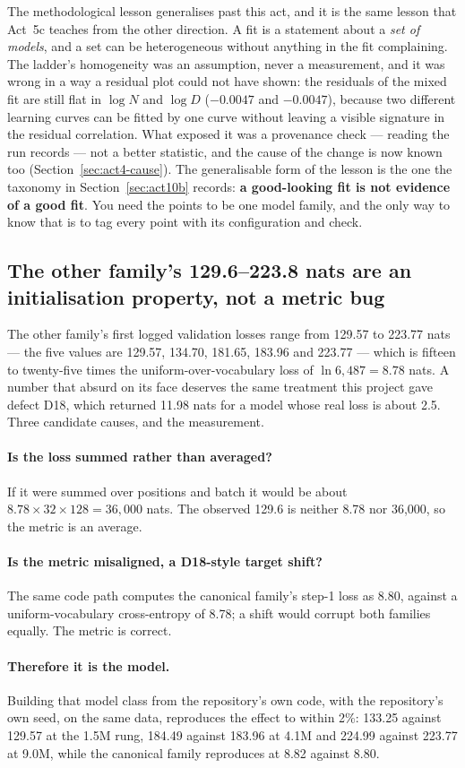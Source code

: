 \documentclass[11pt,a4paper]{article}
\begin{document}
The methodological lesson generalises past this act, and it is the same lesson
that Act~5c teaches from the other direction. A fit is a statement about a
\emph{set of models}, and a set can be heterogeneous without anything in the
fit complaining. The ladder's homogeneity was an assumption, never a
measurement, and it was wrong in a way a residual plot could not have shown:
the residuals of the mixed fit are still flat in $\log N$ and $\log D$
($-0.0047$ and $-0.0047$), because two different learning curves can be
fitted by one curve without leaving a visible signature in the residual
correlation. What exposed it was a provenance check --- reading the run
records --- not a better statistic, and the cause of the change is now known
too (Section~\ref{sec:act4-cause}). The generalisable form of the lesson is
the one the taxonomy in Section~\ref{sec:act10b} records: \textbf{a
good-looking fit is not evidence of a good fit}. You need the points to be one
model family, and the only way to know that is to tag every point with its
configuration and check.

\subsection{The other family's 129.6--223.8 nats are an initialisation property, not a metric bug}
\label{sec:act4-other}

The other family's first logged validation losses range from 129.57 to 223.77
nats --- the five values are 129.57, 134.70, 181.65, 183.96 and 223.77 ---
which is fifteen to twenty-five times the uniform-over-vocabulary loss of
$\ln 6{,}487 = 8.78$ nats. A number that absurd on its face deserves
the same treatment this project gave defect D18, which returned 11.98 nats for
a model whose real loss is about 2.5. Three candidate causes, and the
measurement. %

\paragraph{Is the loss summed rather than averaged?} If it were summed over
positions and batch it would be about $8.78 \times 32 \times 128 = 36{,}000$
nats. The observed 129.6 is neither 8.78 nor 36,000, so the metric is an
average. \paragraph{Is the metric misaligned, a D18-style target shift?} The
same code path computes the canonical family's step-1 loss as 8.80, against a
uniform-vocabulary cross-entropy of 8.78; a shift would corrupt both families
equally. The metric is correct. \paragraph{Therefore it is the model.} Building
that model class from the repository's own code, with the repository's own
seed, on the same data, reproduces the effect to within 2\%: 133.25 against
129.57 at the 1.5M rung, 184.49 against 183.96 at 4.1M and 224.99 against
223.77 at 9.0M, while the canonical family reproduces at 8.82 against 8.80.
\end{document}
